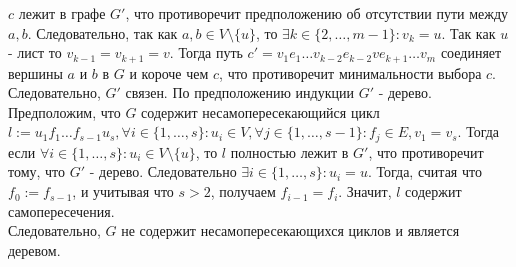 \documentclass{article}
\newcommand{\range}[2]{
    \{#1, \ldots, #2 \}
}
\begin{document}
\begin{itemize}
     $c$ лежит в графе $G'$, что противоречит предположению об отсутствии пути между $a, b$. Следовательно, так как
     $a, b \in V \setminus \{u\}$, то 
     $\exists k \in \range{2}{m - 1}: v_k = u$. Так как $u$ - лист то $v_{k - 1} = v_{k + 1} = v$. Тогда путь
     $c' = v_1e_1\ldots v_{k-2}e_{k-2}ve_{k + 1} \ldots v_m$ соединяет вершины $a$ и $b$ в $G$ и короче чем $c$, что
     противоречит минимальности выбора $c$.\\
    Следовательно, $G'$ связен. По предположению индукции $G'$ - дерево.\\
    Предположим, что $G$ содержит несамопересекающийся цикл 
    $l := u_1f_1 \ldots f_{s - 1}u_s, \forall i \in \range{1}{s}: u_i \in V, \forall j \in \range{1}{s - 1}: f_j \in E,
    v_1 = v_s $. Тогда если $\forall i \in \range{1}{s}: u_i \in V \setminus \{u\}$, то $l$ полностью лежит в $G'$, что противоречит
    тому, что $G'$ - дерево. Следовательно $\exists i \in \range{1}{s}: u_i = u$. Тогда, считая что
    $f_{0} := f_{s - 1}$, и учитывая что $s > 2$, получаем $f_{i - 1} = f_{i}$. Значит, $l$ содержит самопересечения.\\
    Следовательно, $G$ не содержит несамопересекающихся циклов и является деревом.
    \end{itemize}
\end{document}
